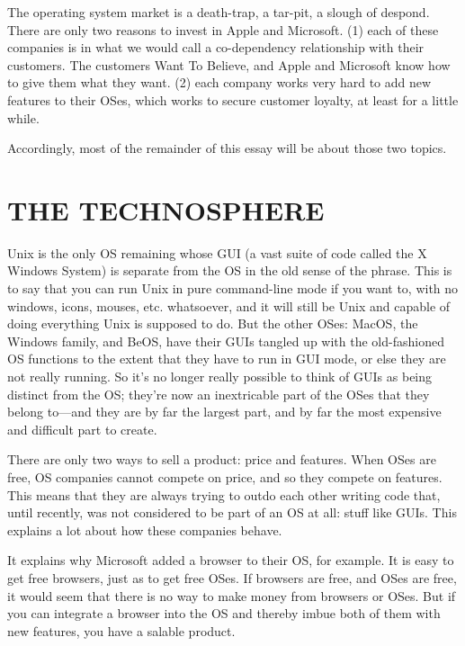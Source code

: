 \documentclass[
  fontsize=11pt,
  paper=landscape,
  twocolumn=true,
  pagesize=pdftex,
  headings=small,
  DIV=15,
  ]{scrartcl}
\begin{document}
The operating system market is a death-trap, a tar-pit, a slough of
despond. There are only two reasons to invest in Apple and Microsoft.
(1) each of these companies is in what we would call a co-dependency
relationship with their customers. The customers Want To Believe, and
Apple and Microsoft know how to give them what they want. (2) each
company works very hard to add new features to their OSes, which works
to secure customer loyalty, at least for a little while.

Accordingly, most of the remainder of this essay will be about those two
topics.

\section{THE TECHNOSPHERE}

Unix is the only OS remaining whose GUI (a vast suite of code called the
X Windows System) is separate from the OS in the old sense of the
phrase. This is to say that you can run Unix in pure command-line mode
if you want to, with no windows, icons, mouses, etc. whatsoever, and it
will still be Unix and capable of doing everything Unix is supposed to
do. But the other OSes: MacOS, the Windows family, and BeOS, have their
GUIs tangled up with the old-fashioned OS functions to the extent that
they have to run in GUI mode, or else they are not really running. So
it's no longer really possible to think of GUIs as being distinct from
the OS; they're now an inextricable part of the OSes that they belong
to---and they are by far the largest part, and by far the most expensive
and difficult part to create.

There are only two ways to sell a product: price and features. When OSes
are free, OS companies cannot compete on price, and so they compete on
features. This means that they are always trying to outdo each other
writing code that, until recently, was not considered to be part of an
OS at all: stuff like GUIs. This explains a lot about how these
companies behave.

It explains why Microsoft added a browser to their OS, for example. It
is easy to get free browsers, just as to get free OSes. If browsers are
free, and OSes are free, it would seem that there is no way to make
money from browsers or OSes. But if you can integrate a browser into the
OS and thereby imbue both of them with new features, you have a salable
product.
\end{document}
